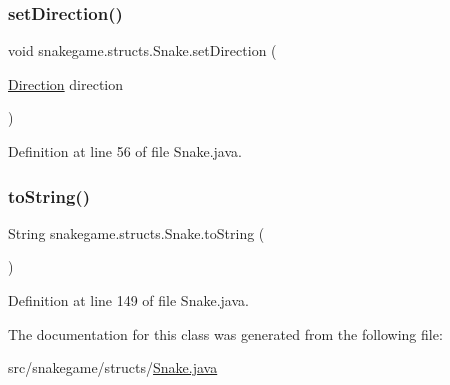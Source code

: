 \subsubsection{\texorpdfstring{set\+Direction()}{setDirection()}}
{\footnotesize\ttfamily void snakegame.\+structs.\+Snake.\+set\+Direction (\begin{DoxyParamCaption}\item[{\mbox{\hyperlink{enumsnakegame_1_1structs_1_1_direction}{Direction}}}]{direction }\end{DoxyParamCaption})}



Definition at line 56 of file Snake.\+java.

\mbox{\label{classsnakegame_1_1structs_1_1_snake_a7ebadfc8fb3f4b24d0de3a6b3bde703e}} 
\subsubsection{\texorpdfstring{to\+String()}{toString()}}
{\footnotesize\ttfamily String snakegame.\+structs.\+Snake.\+to\+String (\begin{DoxyParamCaption}{ }\end{DoxyParamCaption})}



Definition at line 149 of file Snake.\+java.



The documentation for this class was generated from the following file\+:\begin{DoxyCompactItemize}
\item 
src/snakegame/structs/\mbox{\hyperlink{structs_2snake_8java}{Snake.\+java}}\end{DoxyCompactItemize}
